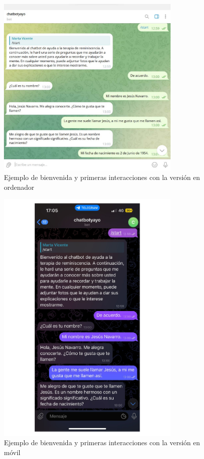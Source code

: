 \begin{figure}[h]
	\centering
	\includegraphics[width=0.8\textwidth]{Imagenes/bienvenidaOrdenador}
	\caption{Ejemplo de bienvenida y primeras interacciones con la versión en ordenador}
	\label{fig:bienvenidaOrdenador}
\end{figure}

\begin{figure}[h]
	\centering
	\includegraphics[width=0.8\textwidth]{Imagenes/bienvenidaMovil}
	\caption{Ejemplo de bienvenida y primeras interacciones con la versión en móvil}
	\label{fig:bienvenidaMovil}
\end{figure}





